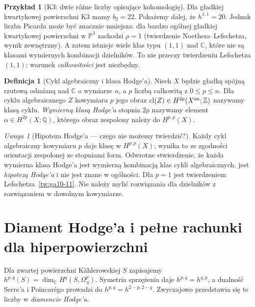 \documentclass[11pt,a4paper,openany]{report}
\numberwithin{equation}{section}
\theoremstyle{plain}
\theoremstyle{definition}
\newtheorem{definicja}[twierdzenie]{Definicja}
\newtheorem{przyklad}[twierdzenie]{Przykład}
\theoremstyle{remark}
\newtheorem{uwaga}[twierdzenie]{Uwaga}
\newcommand{\Z}{\mathbb Z}
\newcommand{\Q}{\mathbb Q}
\newcommand{\C}{\mathbb C}
\newcommand{\PP}{\mathbb P}
\begin{document}
\begin{przyklad}[K3: dwie różne liczby opisujące kohomologię]
Dla gładkiej kwartykowej powierzchni K3 mamy
$b_2=22$. Pokażemy dalej, że $h^{1,1}=20$.
Jednak liczba Picarda może być znacznie mniejsza:
dla bardzo ogólnej gładkiej kwartykowej powierzchni
w $\PP^3$ zachodzi $\rho=1$ (twierdzenie
Noethera--Lefschetza, wynik zewnętrzny).
A zatem istnieje wiele klas typu $(1,1)$ nad $\C$,
które nie są klasami wymiernych kombinacji dzielników.
To nie przeczy twierdzeniu Lefschetza $(1,1)$:
warunek \emph{całkowitości} jest niezbędny.
\end{przyklad}

\begin{definicja}[Cykl algebraiczny i klasa Hodge'a]
Niech $X$ będzie gładką spójną rzutową odmianą nad $\C$
o wymiarze $n$, a $p$ liczbą całkowitą z $0\le p\le n$.
Dla cyklu algebraicznego $Z$ kowymiaru $p$ jego obraz
$\operatorname{cl}(Z)\in H^{2p}(X^{\rm an};\Z)$
nazywamy klasą cyklu. \emph{Wymierną klasą Hodge'a}
stopnia $2p$ nazywamy element
$\alpha\in H^{2p}(X;\Q)$, którego obraz zespolony
należy do $H^{p,p}(X)$.
\end{definicja}

\begin{uwaga}[Hipoteza Hodge'a — czego nie możemy twierdzić?]
Każdy cykl algebraiczny kowymiaru $p$ daje klasę
w $H^{p,p}(X)$; wynika to ze zgodności orientacji
zespolonej ze stopniami form. Odwrotne stwierdzenie,
że każda wymierna klasa Hodge'a jest wymierną kombinacją
klas cykli algebraicznych, jest \emph{hipotezą Hodge'a}
i nie jest znane w ogólności. Dla $p=1$ jest twierdzeniem
Lefschetza~\ref{tw:ga10-11}. Nie należy mylić
rozwiązania dla dzielników z rozwiązaniem
w dowolnym kowymiarze.
\end{uwaga}

\section{Diament Hodge'a i pełne rachunki dla hiperpowierzchni}
\label{sec:ga10-hodge-numbers}

Dla zwartej powierzchni Kählerowskiej $S$ zapisujemy
$h^{p,q}(S)=\dim_{\C}H^q(S,\Omega^p_S)$.
Symetria sprzężenia daje $h^{p,q}=h^{q,p}$,
a dualność Serre'a i Poincarégo prowadzi do
$h^{p,q}=h^{2-p,2-q}$. Zwyczajowo przedstawia się te
liczby w \emph{diamencie Hodge'a}.
\end{document}
